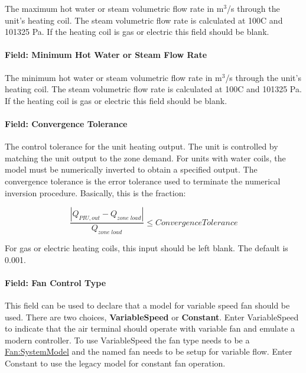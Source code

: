 The maximum hot water or steam volumetric flow rate in m\(^{3}\)/s through the unit's heating coil. The steam volumetric flow rate is calculated at 100C and 101325 Pa. If the heating coil is gas or electric this field should be blank.

\paragraph{Field: Minimum Hot Water or Steam Flow Rate}\label{field-minimum-hot-water-or-steam-flow-rate-5}

The minimum hot water or steam volumetric flow rate in m\(^{3}\)/s through the unit's heating coil. The steam volumetric flow rate is calculated at 100C and 101325 Pa. If the heating coil is gas or electric this field should be blank.

\paragraph{Field: Convergence Tolerance}\label{field-convergence-tolerance-4}

The control tolerance for the unit heating output. The unit is controlled by matching the unit output to the zone demand. For units with water coils, the model must be numerically inverted to obtain a specified output. The convergence tolerance is the error tolerance used to terminate the numerical inversion procedure. Basically, this is the fraction:

\begin{equation}
\frac{{\left| {{Q_{PIU,out}} - {Q_{zone\;load}}} \right|}}{{{Q_{zone\;load}}}} \le ConvergenceTolerance
\end{equation}

For gas or electric heating coils, this input should be left blank. The default is 0.001.

\paragraph{Field: Fan Control Type}\label{field-fan-control-type-parallelPIU}

This field can be used to declare that a model for variable speed fan should be used. There are two choices, \textbf{VariableSpeed} or \textbf{Constant}.  Enter VariableSpeed to indicate that the air terminal should operate with variable fan and emulate a modern controller. To use VariableSpeed the fan type needs to be a \hyperref[fansystemmodel]{Fan:SystemModel} and the named fan needs to be setup for variable flow. Enter Constant to use the legacy model for constant fan operation.

